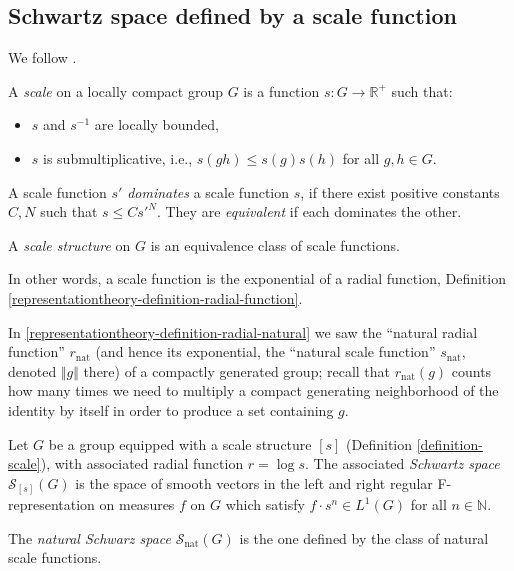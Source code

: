 \subsection{Schwartz space defined by a scale function}
\label{subsection-Schwartz-scale}

We follow \cite[\S 2]{Bernstein-Kroetz}.

\begin{definition}
 \label{definition-scale}
A {\it scale} on a locally compact group $G$ is a function $s : G \to \mathbb R^+$ such that:
\begin{itemize}
 \item $s$ and $s^{-1}$ are locally bounded,
 \item $s$ is submultiplicative, i.e., $s(gh) \le s(g)s(h)$ for all $g, h \in G$.
\end{itemize}

A scale function $s'$ \emph{dominates} a scale function $s$, if there exist positive constants $C, N$ such that $s \le C s'^N$. They are \emph{equivalent} if each dominates the other. 


A {\it scale structure} on $G$ is an equivalence class of scale
functions.
\end{definition}

In other words, a scale function is the exponential of a radial function, Definition \ref{representationtheory-definition-radial-function}.


In \ref{representationtheory-definition-radial-natural} we saw the ``natural radial function'' $r_{\text{nat}}$ (and hence its exponential, the ``natural scale function'' $s_{\text{nat}}$, denoted $\Vert g\Vert$ there) of a compactly generated group; recall that $r_{\text{nat}}(g)$ counts how many times we need to multiply a compact generating neighborhood of the identity by itself in order to produce a set containing $g$. 


\begin{definition}
 \label{definition-Schwartz-space}
Let $G$ be a group equipped with a scale structure $[s]$ (Definition \ref{definition-scale}), with associated radial function $r=\log s$. The associated {\it Schwartz space} $\mathcal S_{[s]}(G)$ is the space of smooth vectors in the left and right regular F-representation on measures $f$ on $G$ which satisfy $f \cdot s^n \in L^1(G)$ for all $n\in \mathbb N$. 

 The {\it natural Schwarz space} $\mathcal S_{\text{nat}}(G)$ is the one defined by the class of natural scale functions. 
\end{definition}

